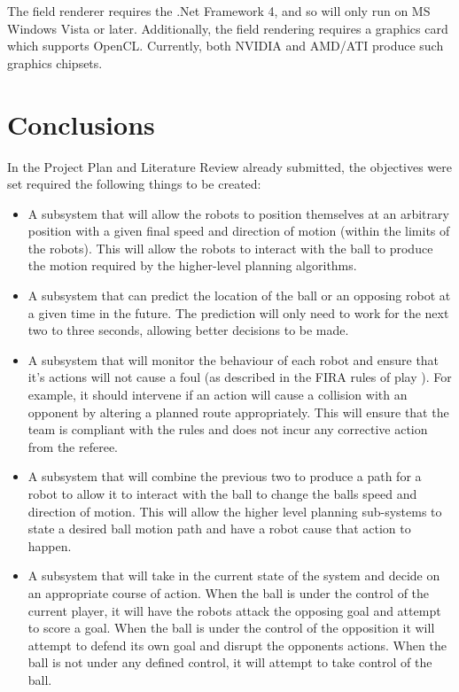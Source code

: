 \documentclass[10pt]{article}
\begin{document}
The field renderer requires the .Net Framework 4, and so will only run on MS
Windows Vista or later.  Additionally, the field rendering requires a graphics
card which supports OpenCL.  Currently, both NVIDIA and AMD/ATI produce such
graphics chipsets.

\section{Conclusions}

In the Project Plan and Literature Review already submitted, the objectives were
set required the following things to be created:

\begin{itemize}
\item A subsystem that will allow the robots to position themselves at an
arbitrary position with a given final speed and direction of motion (within the
limits of the robots).  This will allow the robots to interact with the ball to
produce the motion required by the higher-level planning algorithms.
\item A subsystem that can predict the location of the ball or an opposing robot
at a given time in the future.  The prediction will only need to work for the
next two to three seconds, allowing better decisions to be made.
\item A subsystem that will monitor the behaviour of each robot and ensure that
it's actions will not cause a foul (as described in the FIRA rules of play
\cite{simurosotSim}).  For example, it should intervene if an action will cause
a collision with an opponent by altering a planned route appropriately.  This
will ensure that the team is compliant with the rules and does not incur any
corrective action from the referee.
\item A subsystem that will combine the previous two to produce a path for a
robot to allow it to interact with the ball to change the balls speed and
direction of motion.  This will allow the higher level planning sub-systems to
state a desired ball motion path and have a robot cause that action to happen.
\item A subsystem that will take in the current state of the system and decide
on an appropriate course of action. When the ball is under the control of the
current player, it will have the robots attack the opposing goal and attempt to
score a goal.  When the ball is under the control of the opposition it will
attempt to defend its own goal and disrupt the opponents actions. When the ball
is not under any defined control, it will attempt to take control of the ball.
\end{itemize}
\end{document}
